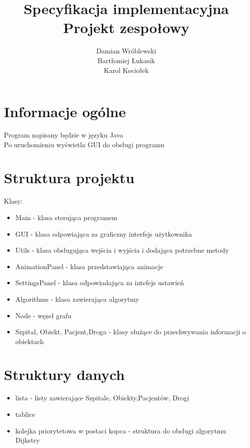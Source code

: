 \documentclass[] {article}
\title{Specyfikacja implementacyjna\\Projekt zespołowy}
\author{Damian Wróblewski\\Bartłomiej Łukasik\\Karol Kociołek}
\begin{document}
\maketitle

\section{Informacje ogólne}
Program napisany będzie w języku Java\\
Po uruchomieniu wyświetla GUI do obsługi programu

\section{Struktura projektu}
Klasy:
\begin{itemize}
	\item Main - klasa sterująca programem
	\item GUI - klasa odpowiająca za graficzny interfejs użytkownika
	\item Utils - klasa obsługująca wejścia i wyjścia i dodająca potrzebne metody
	\item AnimationPanel - klasa przedstawiająca animacje
	\item SettingsPanel - klasa odpowiadająca za intefejs ustawień
	\item Algorithms - klasa zawierająca algorytmy
     	\item Node - węzeł grafu
	\item Szpital, Obiekt, Pacjent,Droga - klasy służące do przechwywania informacji o obiektach
\end{itemize}

\section {Struktury danych}
\begin{itemize}
	\item lista - listy zawierające Szpitale, Obiekty,Pacjentów, Drogi
	\item tablice 
	\item kolejka priorytetowa w postaci kopca - struktura do obsługi algorytmu Dijkstry

\end{itemize}
\end{document}

